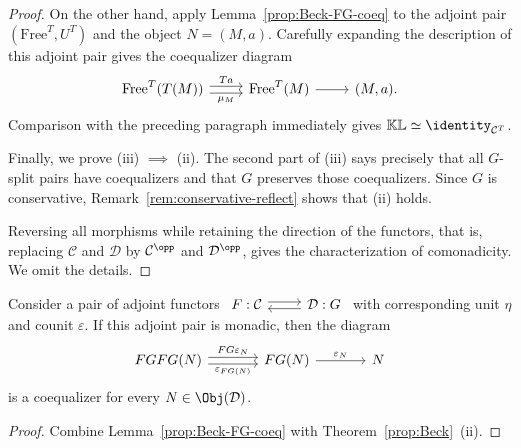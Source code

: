 \begin{proof}
	On the other hand, apply Lemma~\ref{prop:Beck-FG-coeq} to the adjoint pair
	$(\mathrm{Free}^T,U^T)$ and the object $N=(M,a)$. Carefully expanding the
	description of this adjoint pair gives the coequalizer diagram
	\[\begin{tikzcd}[row sep=tiny]
		\mathrm{Free}^T(T(M)) \arrow[shift left, r, "Ta"] \arrow[shift right, r, "\mu_M"'] & \mathrm{Free}^T(M) \arrow[r] & (M, a).
	\end{tikzcd}\]
	Comparison with the preceding paragraph immediately gives
	$\mathbb{K}\mathbb{L}\simeq\identity_{\mathcal{C}^T}$.

	Finally, we prove (iii) $\implies$ (ii). The second part of (iii) says
	precisely that all $G$-split pairs have coequalizers and that $G$ preserves
	those coequalizers. Since $G$ is conservative,
	Remark~\ref{rem:conservative-reflect} shows that (ii) holds.

	Reversing all morphisms while retaining the direction of the functors,
	that is, replacing $\mathcal{C}$ and $\mathcal{D}$ by
	$\mathcal{C}^{\opp}$ and $\mathcal{D}^{\opp}$, gives the characterization
	of comonadicity. We omit the details.
\end{proof}

\begin{corollary}
	Consider a pair of adjoint functors
	$\begin{tikzcd}
		F: \mathcal{C} \arrow[shift left, r] & \mathcal{D}: G \arrow[shift left, l]
	\end{tikzcd}$
	with corresponding unit $\eta$ and counit $\varepsilon$. If this adjoint
	pair is monadic, then the diagram
	\[\begin{tikzcd}[column sep=large]
		FGFG(N) \arrow[shift left, r, "FG\varepsilon_N"] \arrow[shift right, r, "\varepsilon_{FG(N)}"'] & FG(N) \arrow[r, "\varepsilon_N"] & N
	\end{tikzcd}\]
	is a coequalizer for every $N\in\Obj(\mathcal{D})$.
\end{corollary}
\begin{proof}
	Combine Lemma~\ref{prop:Beck-FG-coeq} with
	Theorem~\ref{prop:Beck}~(ii).
\end{proof}

